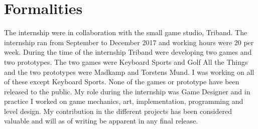 \section{Formalities}
The internship were in collaboration with the small game studio, Triband. The internship ran from September to December 2017 and working hours were 20 per week. During the time of the internship Triband were developing two games and two prototypes. The two games were Keyboard Sports and Golf All the Things and the two prototypes were Madkamp and Torstens Mund. I was working on all of these except Keyboard Sports. None of the games or prototype have been released to the public. My role during the internship was Game Designer and in practice I worked on game mechanics, art, implementation, programming and level design. My contribution in the different projects has been considered valuable and will as of writing be apparent in any final release.
